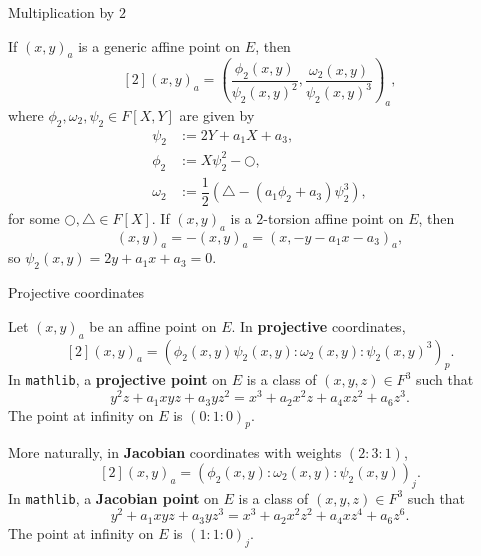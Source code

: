 \documentclass[10pt]{beamer}
\begin{document}
\begin{frame}[t]{Multiplication by $ 2 $}

If $ (x, y)_a $ is a generic affine point on $ E $, then
$$ [2](x, y)_a = \left(\dfrac{\phi_2(x, y)}{\psi_2(x, y)^2}, \dfrac{\omega_2(x, y)}{\psi_2(x, y)^3}\right)_a, $$
where $ \phi_2, \omega_2, \psi_2 \in F[X, Y] $ are given by
\begin{align*}
\psi_2 & := 2Y + a_1X + a_3, \\
\phi_2 & := X\psi_2^2 - \bigcirc, \\
\omega_2 & := \dfrac{1}{2}(\triangle - (a_1\phi_2 + a_3)\psi_2^3),
\end{align*}
for some $ \bigcirc, \triangle \in F[X] $. \pause If $ (x, y)_a $ is a $ 2 $-torsion affine point on $ E $, then
$$ (x, y)_a = -(x, y)_a = (x, -y - a_1x - a_3)_a, $$
so $ \psi_2(x, y) = 2y + a_1x + a_3 = 0 $.

\end{frame}

\begin{frame}[t]{Projective coordinates}

Let $ (x, y)_a $ be an affine point on $ E $. In \textbf{projective} coordinates,
$$ [2](x, y)_a = (\phi_2(x, y)\psi_2(x, y) : \omega_2(x, y) : \psi_2(x, y)^3)_p. $$
In \texttt{mathlib}, a \textbf{projective point} on $ E $ is a class of $ (x, y, z) \in F^3 $ such that
$$ y^2z + a_1xyz + a_3yz^2 = x^3 + a_2x^2z + a_4xz^2 + a_6z^3. $$
The point at infinity on $ E $ is $ (0 : 1 : 0)_p $.

\pause

\vspace{0.5cm} More naturally, in \textbf{Jacobian} coordinates with weights $ (2 : 3 : 1) $,
$$ [2](x, y)_a = (\phi_2(x, y) : \omega_2(x, y) : \psi_2(x, y))_j. $$
In \texttt{mathlib}, a \textbf{Jacobian point} on $ E $ is a class of $ (x, y, z) \in F^3 $ such that
$$ y^2 + a_1xyz + a_3yz^3 = x^3 + a_2x^2z^2 + a_4xz^4 + a_6z^6. $$
The point at infinity on $ E $ is $ (1 : 1 : 0)_j $.

\end{frame}
\end{document}
